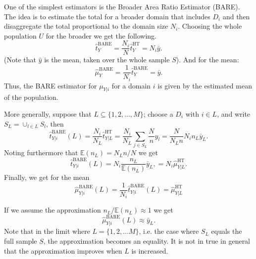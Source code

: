 \documentclass[fleqn,11pt]{article}
\begin{document}
One of the simplest estimators is the Broader Area Ratio Estimator (BARE). The
idea is to estimate the total for a broader domain that includes $D_i$ and then
disaggregate the total proportional to the domain size $N_i$. Choosing the
whole population $U$ for the broader we get the following.
$$
\hat{t}^{\textrm{BARE}}_Y = \frac{N_i}{N}\hat{t}^{\textrm{HT}}_Y = N_i\bar{y}.
$$
(Note that $\hat{y}$ is the mean, taken over the whole sample $S$). And for the
mean:
$$
\hat{\mu}^{\textrm{BARE}}_Y  = \frac{1}{N_i}\hat{t}^{\textrm{BARE}}_Y  = \bar{y}.
$$
Thus, the BARE estimator for $\mu_{Y|i}$ for a domain $i$ is given by the
estimated mean of the population.

More generally, suppose that $L\subseteq \{1,2,\ldots,M\}$; choose a $D_i$
with $i\in L$, and write $S_L = \cup_{l\in L}{S_l}$, then
%
$$
\hat{t}^{\textrm{BARE}}_{Y|i}(L) 
= \frac{N_i}{N_L}\hat{t}^{\textrm{HT}}_{Y|L}
=\frac{N_i}{N_L}\sum_{j\in S_L}\frac{N}{n}y_l 
= \frac{N}{N_L n}N_i n_L\bar{y}_L.
$$ 
Noting furthermore that $\mathbb{E}(n_L)=N_Ln/N$ we get
$$
\hat{t}^{\textrm{BARE}}_{Y|i}(L)= N_i\frac{n_L}{\mathbb{E}(n_L)}\bar{y}_L,
= N_i \hat{\mu}^{\textrm{HT}}_{Y|L}.
$$
Finally, we get for the mean
$$
\hat{\mu}^{\textrm{BARE}}_{Y|i}(L) 
= \frac{1}{N_i}\hat{t}^{\textrm{BARE}}_{Y|i}(L)
= \hat{\mu}^{\textrm{HT}}_{Y|L}
$$

If we assume the approximation $n_L/\mathbb{E}(n_L)\approx 1$ we get
$$
\hat{\mu}^{\textrm{BARE}}_{Y|i}(L)\approx \bar{y}_L.
$$
Note that in the limit where $L=\{1,2,\ldots M\}$, i.e. the case where $S_L$
equals the full sample $S$, the approximation becomes an equality. It is not in
true in general that the approximation improves when $L$ is increased. 
\end{document}
